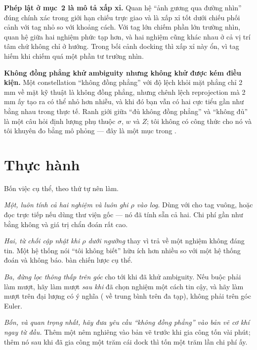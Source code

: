\documentclass[../../marker.tex]{subfiles}
\begin{document}
\textbf{Phép lật ở mục~2 là mô tả xấp xỉ.} Quan hệ ``ảnh gương qua đường nhìn'' đúng chính xác trong giới hạn chiếu trực giao và là xấp xỉ tốt dưới chiếu phối cảnh với tag nhỏ so với khoảng cách. Với tag lớn chiếm phần lớn trường nhìn, quan hệ giữa hai nghiệm phức tạp hơn, và hai nghiệm cũng khác nhau ở cả vị trí tâm chứ không chỉ ở hướng. Trong bối cảnh docking thì xấp xỉ này ổn, vì tag hiếm khi chiếm quá một phần tư trường nhìn.

\textbf{Không đồng phẳng khử ambiguity nhưng không khử được kém điều kiện.} Một constellation ``không đồng phẳng'' với độ lệch khỏi mặt phẳng chỉ 2\,mm về mặt kỹ thuật là không đồng phẳng, nhưng chênh lệch reprojection mà 2\,mm ấy tạo ra có thể nhỏ hơn nhiễu, và khi đó bạn vẫn có hai cực tiểu gần như bằng nhau trong thực tế. Ranh giới giữa ``đủ không đồng phẳng'' và ``không đủ'' là một câu hỏi định lượng phụ thuộc \(\sigma\), \(w\) và \(Z\); tôi không có công thức cho nó và tôi khuyên đo bằng mô phỏng --- đây là một mục trong .

\section{Thực hành}

Bốn việc cụ thể, theo thứ tự nên làm.

\emph{Một, luôn tính cả hai nghiệm và luôn ghi \(\rho\) vào log.} Dùng  với  cho tag vuông, hoặc đọc trực tiếp  nếu dùng thư viện gốc --- nó đã tính sẵn cả hai. Chi phí gần như bằng không và giá trị chẩn đoán rất cao.

\emph{Hai, từ chối cập nhật khi \(\rho\) dưới ngưỡng} thay vì trả về một nghiệm không đáng tin. Một hệ thống nói ``tôi không biết'' hữu ích hơn nhiều so với một hệ thống đoán và không báo.  bàn chiến lược cụ thể.

\emph{Ba, đừng lọc thông thấp trên góc} cho tới khi đã khử ambiguity. Nếu buộc phải làm mượt, hãy làm mượt \emph{sau khi} đã chọn nghiệm một cách tin cậy, và hãy làm mượt trên đại lượng có ý nghĩa ( về trung bình trên đa tạp), không phải trên góc Euler.

\emph{Bốn, và quan trọng nhất, hãy đưa yêu cầu ``không đồng phẳng'' vào bản vẽ cơ khí ngay từ đầu.} Thêm một nêm nghiêng vào bản vẽ trước khi gia công tốn vài phút; thêm nó sau khi đã gia công một trăm cái dock thì tốn một trăm lần chi phí ấy.
\end{document}
